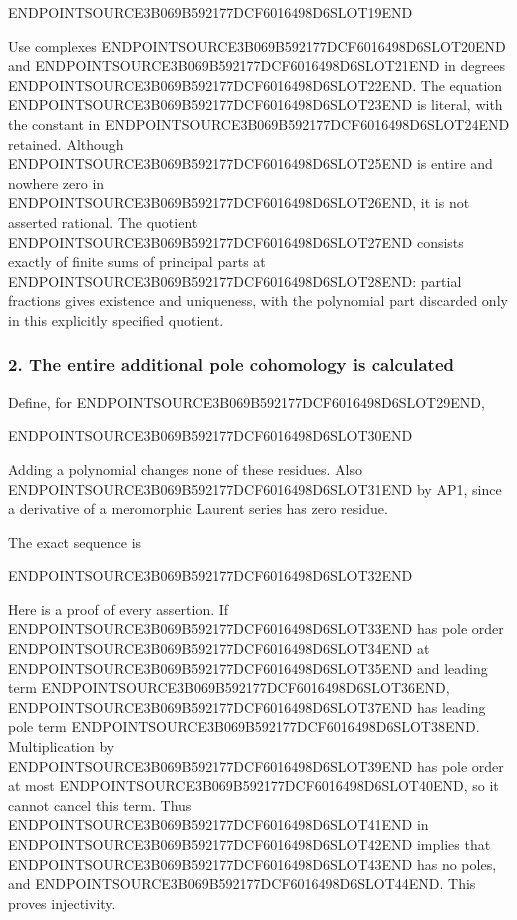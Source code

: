 ENDPOINTSOURCE3B069B592177DCF6016498D6SLOT19END

Use complexes ENDPOINTSOURCE3B069B592177DCF6016498D6SLOT20END and ENDPOINTSOURCE3B069B592177DCF6016498D6SLOT21END in degrees ENDPOINTSOURCE3B069B592177DCF6016498D6SLOT22END. The equation ENDPOINTSOURCE3B069B592177DCF6016498D6SLOT23END is literal, with the constant in ENDPOINTSOURCE3B069B592177DCF6016498D6SLOT24END retained. Although ENDPOINTSOURCE3B069B592177DCF6016498D6SLOT25END is entire and nowhere zero in ENDPOINTSOURCE3B069B592177DCF6016498D6SLOT26END, it is not asserted rational. The quotient ENDPOINTSOURCE3B069B592177DCF6016498D6SLOT27END consists exactly of finite sums of principal parts at ENDPOINTSOURCE3B069B592177DCF6016498D6SLOT28END: partial fractions gives existence and uniqueness, with the polynomial part discarded only in this explicitly specified quotient.

\subsubsection{2. The entire additional pole cohomology is calculated}\label{endpoint-analytic_pole--the-entire-additional-pole-cohomology-is-calculated}

Define, for ENDPOINTSOURCE3B069B592177DCF6016498D6SLOT29END,

ENDPOINTSOURCE3B069B592177DCF6016498D6SLOT30END

Adding a polynomial changes none of these residues. Also ENDPOINTSOURCE3B069B592177DCF6016498D6SLOT31END by AP1, since a derivative of a meromorphic Laurent series has zero residue.

The exact sequence is

ENDPOINTSOURCE3B069B592177DCF6016498D6SLOT32END

Here is a proof of every assertion. If ENDPOINTSOURCE3B069B592177DCF6016498D6SLOT33END has pole order ENDPOINTSOURCE3B069B592177DCF6016498D6SLOT34END at ENDPOINTSOURCE3B069B592177DCF6016498D6SLOT35END and leading term ENDPOINTSOURCE3B069B592177DCF6016498D6SLOT36END, ENDPOINTSOURCE3B069B592177DCF6016498D6SLOT37END has leading pole term ENDPOINTSOURCE3B069B592177DCF6016498D6SLOT38END. Multiplication by ENDPOINTSOURCE3B069B592177DCF6016498D6SLOT39END has pole order at most ENDPOINTSOURCE3B069B592177DCF6016498D6SLOT40END, so it cannot cancel this term. Thus ENDPOINTSOURCE3B069B592177DCF6016498D6SLOT41END in ENDPOINTSOURCE3B069B592177DCF6016498D6SLOT42END implies that ENDPOINTSOURCE3B069B592177DCF6016498D6SLOT43END has no poles, and ENDPOINTSOURCE3B069B592177DCF6016498D6SLOT44END. This proves injectivity.

